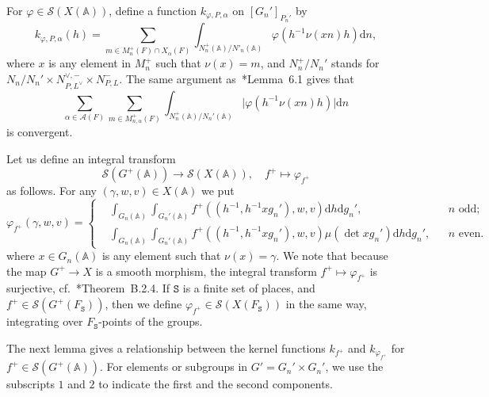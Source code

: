 \documentclass[letterpaper,11pt]{amsart}
\newcommand{\bA}{\mathbb{A}}
\newcommand{\cA}{\mathcal{A}}
\newcommand{\cS}{\mathcal{S}}
\newcommand{\rd}{\mathrm{d}}
\newcommand{\tS}{\mathtt{S}}
\newcommand{\<}{\negthickspace}
\theoremstyle{definition}
\theoremstyle{plain}
\theoremstyle{remark}
\numberwithin{equation}{section}
\begin{document}
For $\varphi \in \cS(X(\bA))$, define a function $k_{\varphi,P,\alpha}$ on
$[G_n']_{P_n'}$ by
    \[
    k_{\varphi,P,\alpha}(h) =
    \sum_{m \in M_{n}^+(F) \cap X_\alpha(F)} \int_{N_{n}^+(\bA)/N'_n(\bA)}
    \varphi(h^{-1}\nu(x n)h) \rd n,
    \]
where $x$ is any element in $M_{n}^+$ such that $\nu(x)=m$, and $N_n^+/N_n'$ stands for $N_n/N_n' \times N_{P,L^\vee}^{\vee,-} \times N_{P,L}^{-}$.  The same argument
as~\cite{BLX1}*{Lemma~6.1} gives that
    \[
    \sum_{\alpha \in \cA(F)} \sum_{m \in M_{n,\alpha}^+(F)}
    \int_{N_{n}^+(\bA)/N_n'(\bA)}
    \lvert \varphi(h^{-1}\nu(x n)h) \rvert \rd n
    \]
is convergent.

Let us define an integral transform
    \[
    \cS(G^+(\bA)) \to \cS(X(\bA)), \quad
    f^+ \mapsto \varphi_{f^+}
    \]
as follows. For any $(\gamma, w, v) \in X(\bA)$ we put
    \begin{equation}    \label{eq:simplified_test_function_GL}
    \varphi_{f^+}(\gamma, w, v) =
    \left\{ \begin{aligned}
    &\int_{G_n(\bA)} \int_{G_n'(\bA)} f^+((h^{-1}, h^{-1} x g_n' ), w, v)
    \rd h \rd g_n', &&\text{$n$ odd};\\
    &\int_{G_n(\bA)} \int_{G_n'(\bA)} f^+((h^{-1}, h^{-1}x g_n'), w, v)
    \mu(\det xg_n')
    \rd h \rd g_n', &&\text{$n$ even}.
    \end{aligned} \right.
    \end{equation}
where $x \in G_n(\bA)$ is any element such that $\nu(x) = \gamma$. We note that
because the map $G^+ \to X$ is a smooth morphism, the
integral transform $f^+ \mapsto \varphi_{f^+}$ is surjective,
cf.~\cite{AG}*{Theorem~B.2.4}. If $\tS$ is a finite set of places, and $f^+
\in \cS(G^+(F_{\tS}))$, then we define $\varphi_{f^+} \in \cS(X(F_{\tS}))$ in
the same way, integrating over $F_{\tS}$-points of the groups.

The next lemma gives a relationship between the kernel functions $k_{f^+}$ and $k_{\varphi_{f^+}}$ for $f^+ \in \cS(G^+(\bA))$.  For elements or subgroups in $G' = G_n' \times G_n'$, we use the subscripts $1$ and $2$ to indicate the first and the second components.
\end{document}
